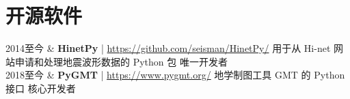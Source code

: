 \section{开源软件}

\begin{EntriesTable}{0.13}{0.02}{0.85}
2014至今 & \textbf{HinetPy} | \url{https://github.com/seisman/HinetPy/} \newline
           用于从 Hi-net 网站申请和处理地震波形数据的 Python 包 \newline
           唯一开发者 \\
2018至今 & \textbf{PyGMT} | \url{https://www.pygmt.org/} \newline
           地学制图工具 GMT 的 Python 接口 \newline
           核心开发者 \\
\end{EntriesTable}
